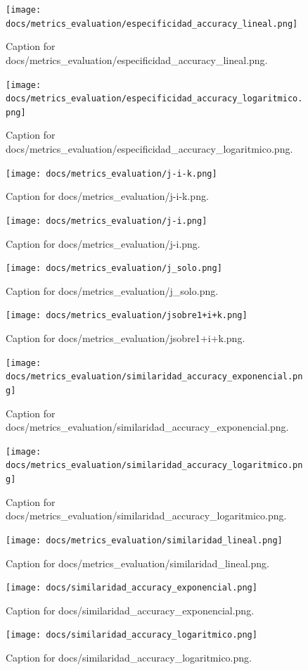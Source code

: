 \documentclass{article}
\begin{document}
\begin{figure}[h] \centering \texttt{[image: docs/metrics\_evaluation/especificidad\_accuracy\_lineal.png]} \caption{Caption for docs/metrics_evaluation/especificidad_accuracy_lineal.png.} \end{figure}
\begin{figure}[h] \centering \texttt{[image: docs/metrics\_evaluation/especificidad\_accuracy\_logaritmico.png]} \caption{Caption for docs/metrics_evaluation/especificidad_accuracy_logaritmico.png.} \end{figure}
\begin{figure}[h] \centering \texttt{[image: docs/metrics\_evaluation/j-i-k.png]} \caption{Caption for docs/metrics_evaluation/j-i-k.png.} \end{figure}
\begin{figure}[h] \centering \texttt{[image: docs/metrics\_evaluation/j-i.png]} \caption{Caption for docs/metrics_evaluation/j-i.png.} \end{figure}
\begin{figure}[h] \centering \texttt{[image: docs/metrics\_evaluation/j\_solo.png]} \caption{Caption for docs/metrics_evaluation/j_solo.png.} \end{figure}
\begin{figure}[h] \centering \texttt{[image: docs/metrics\_evaluation/jsobre1+i+k.png]} \caption{Caption for docs/metrics_evaluation/jsobre1+i+k.png.} \end{figure}
\begin{figure}[h] \centering \texttt{[image: docs/metrics\_evaluation/similaridad\_accuracy\_exponencial.png]} \caption{Caption for docs/metrics_evaluation/similaridad_accuracy_exponencial.png.} \end{figure}
\begin{figure}[h] \centering \texttt{[image: docs/metrics\_evaluation/similaridad\_accuracy\_logaritmico.png]} \caption{Caption for docs/metrics_evaluation/similaridad_accuracy_logaritmico.png.} \end{figure}
\begin{figure}[h] \centering \texttt{[image: docs/metrics\_evaluation/similaridad\_lineal.png]} \caption{Caption for docs/metrics_evaluation/similaridad_lineal.png.} \end{figure}
\begin{figure}[h] \centering \texttt{[image: docs/similaridad\_accuracy\_exponencial.png]} \caption{Caption for docs/similaridad_accuracy_exponencial.png.} \end{figure}
\begin{figure}[h] \centering \texttt{[image: docs/similaridad\_accuracy\_logaritmico.png]} \caption{Caption for docs/similaridad_accuracy_logaritmico.png.} \end{figure}
\end{document}
